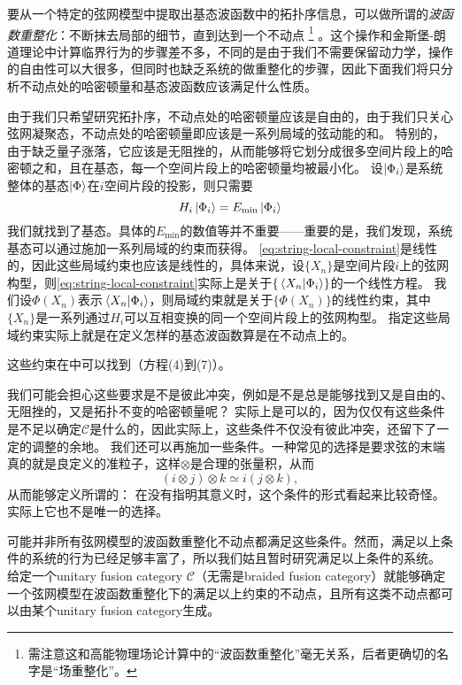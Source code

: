 要从一个特定的弦网模型中提取出基态波函数中的拓扑序信息，可以做所谓的\emph{波函数重整化}：不断抹去局部的细节，直到达到一个不动点%
\footnote{
    需注意这和高能物理场论计算中的“波函数重整化”毫无关系，后者更确切的名字是“场重整化”。
}%
。这个操作和金斯堡-朗道理论中计算临界行为的步骤差不多，不同的是由于我们不需要保留动力学，操作的自由性可以大很多，但同时也缺乏系统的做重整化的步骤，因此下面我们将只分析不动点处的哈密顿量和基态波函数应该满足什么性质。

由于我们只希望研究拓扑序，不动点处的哈密顿量应该是自由的，由于我们只关心弦网凝聚态，不动点处的哈密顿量即应该是一系列局域的弦动能的和。
特别的，由于缺乏量子涨落，它应该是无阻挫的，从而能够将它划分成很多空间片段上的哈密顿之和，且在基态，每一个空间片段上的哈密顿量均被最小化。
设$\ket{\Phi_i}$是系统整体的基态$\ket{\Phi}$在$i$空间片段的投影，则只需要
\begin{equation}
    H_i \ket{\Phi_i} = E_\text{min} \ket{\Phi_i}
    \label{eq:string-local-constraint}
\end{equation}
我们就找到了基态。具体的$E_\text{min}$的数值等并不重要——重要的是，我们发现，系统基态可以通过施加一系列局域的约束而获得。
\eqref{eq:string-local-constraint}是线性的，因此这些局域约束也应该是线性的，具体来说，设$\{X_n\}$是空间片段$i$上的弦网构型，则\eqref{eq:string-local-constraint}实际上是关于$\{ \braket*{X_n}{\Phi_i} \}$的一个线性方程。
我们设$\Phi(X_n)$表示$\braket*{X_n}{\Phi_i}$，则局域约束就是关于$\{\Phi(X_n)\}$的线性约束，其中$\{X_n\}$是一系列通过$H_i$可以互相变换的同一个空间片段上的弦网构型。
指定这些局域约束实际上就是在定义怎样的基态波函数算是在不动点上的。

这些约束在\cite{Levin_2005}中可以找到（方程(4)到(7)）。

我们可能会担心这些要求是不是彼此冲突，例如是不是总是能够找到又是自由的、无阻挫的，又是拓扑不变的哈密顿量呢？
实际上是可以的，因为仅仅有这些条件是不足以确定$\mathcal{C}$是什么的，因此实际上，这些条件不仅没有彼此冲突，还留下了一定的调整的余地。
我们还可以再施加一些条件。一种常见的选择是要求弦的末端真的就是良定义的准粒子，这样$\otimes$是合理的张量积，从而
\[
    (i \otimes j) \otimes k \simeq i (j \otimes k),
\]
从而能够定义所谓的：
在没有指明其意义时，这个条件的形式看起来比较奇怪。实际上它也不是唯一的选择。

可能并非所有弦网模型的波函数重整化不动点都满足这些条件。然而，满足以上条件的系统的行为已经足够丰富了，所以我们姑且暂时研究满足以上条件的系统。
给定一个unitary fusion category $\mathcal{C}$（无需是braided fusion category）就能够确定一个弦网模型在波函数重整化下的满足以上约束的不动点，且所有这类不动点都可以由某个unitary fusion category生成。

